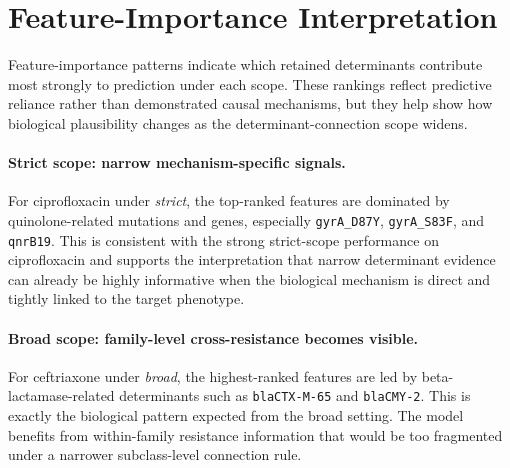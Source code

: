\section{Feature-Importance Interpretation}

Feature-importance patterns indicate which retained determinants contribute most strongly to prediction under each scope. These rankings reflect predictive reliance rather than demonstrated causal mechanisms, but they help show how biological plausibility changes as the determinant-connection scope widens.

\paragraph{Strict scope: narrow mechanism-specific signals.}
For ciprofloxacin under \textit{strict}, the top-ranked features are dominated by quinolone-related mutations and genes, especially \texttt{gyrA\_D87Y}, \texttt{gyrA\_S83F}, and \texttt{qnrB19}. This is consistent with the strong strict-scope performance on ciprofloxacin and supports the interpretation that narrow determinant evidence can already be highly informative when the biological mechanism is direct and tightly linked to the target phenotype.

\paragraph{Broad scope: family-level cross-resistance becomes visible.}
For ceftriaxone under \textit{broad}, the highest-ranked features are led by beta-lactamase-related determinants such as \texttt{blaCTX-M-65} and \texttt{blaCMY-2}. This is exactly the biological pattern expected from the broad setting. The model benefits from within-family resistance information that would be too fragmented under a narrower subclass-level connection rule.

